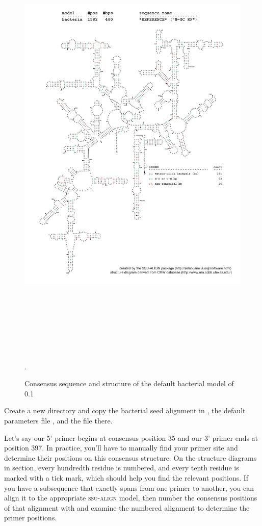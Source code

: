 \begin{figure}
\includegraphics[height=8.5in]{Figures/bacteria-0p1-rf}
\caption{Consensus sequence and structure of the default bacterial
  model of  0.1}.
\label{fig:bacseedrf}
\end{figure}

Create a new directory and copy the bacterial seed alignment in
, the default parameters
file , and the file
 there.

Let's say our 5' primer begins at consensus position 35 and our 3'
primer ends at position 397.  In practice, you'll have to manually
find your primer site and determine their positions on this consensus
structure. On the structure diagrams in section, every
hundredth residue is numbered, and every tenth residue is marked with
a tick mark, which should help you find the relevant positions.  If
you have a subsequence that exactly spans from one primer to another,
you can align it to the appropriate \textsc{ssu-align} model, then
number the consensus positions of that alignment with
 and examine the numbered alignment to
determine the primer positions.

